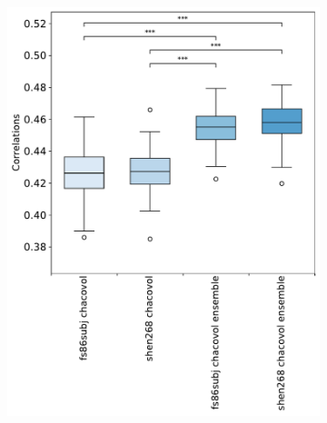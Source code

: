 \documentclass[10pt]{article}
\begin{document}
\begin{figure}
\begin{subfigure}{0.5\textwidth}
  \centering
  \includegraphics[width=1\linewidth]{figures/analysis_6_boxplots_correlations.pdf}
  \caption{}
  \label{fig:sfig1}
\end{subfigure}
\begin{subfigure}{0.5\textwidth}
  \centering

\end{subfigure}
\end{figure}
\end{document}
